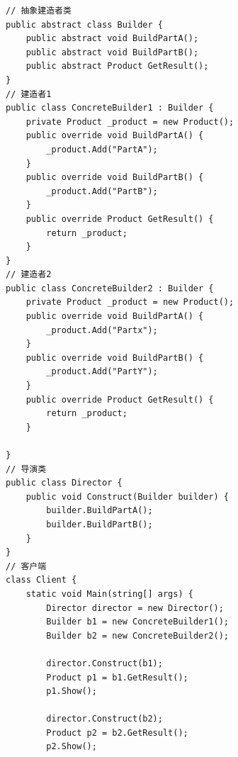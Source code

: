 \documentclass[9pt, b5paper]{article}
\begin{document}
\begin{itemize}
\begin{verbatim}
// 抽象建造者类
public abstract class Builder {
    public abstract void BuildPartA();
    public abstract void BuildPartB();
    public abstract Product GetResult();
}
// 建造者1
public class ConcreteBuilder1 : Builder {
    private Product _product = new Product();
    public override void BuildPartA() {
        _product.Add("PartA");
    }
    public override void BuildPartB() {
        _product.Add("PartB");
    }
    public override Product GetResult() {
        return _product;
    }
}
// 建造者2
public class ConcreteBuilder2 : Builder {
    private Product _product = new Product();
    public override void BuildPartA() {
        _product.Add("Partx");
    }
    public override void BuildPartB() {
        _product.Add("PartY");
    }
    public override Product GetResult() {
        return _product;
    }
 
}
// 导演类
public class Director {
    public void Construct(Builder builder) {
        builder.BuildPartA();
        builder.BuildPartB();
    }
}
// 客户端
class Client {
    static void Main(string[] args) {
        Director director = new Director();
        Builder b1 = new ConcreteBuilder1();
        Builder b2 = new ConcreteBuilder2();

        director.Construct(b1);
        Product p1 = b1.GetResult();
        p1.Show();
 
        director.Construct(b2);
        Product p2 = b2.GetResult();
        p2.Show();
 

\end{verbatim}
\end{itemize}
\end{document}
